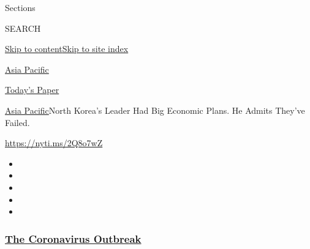Sections

SEARCH

\protect\hyperlink{site-content}{Skip to
content}\protect\hyperlink{site-index}{Skip to site index}

\href{https://www.nytimes3xbfgragh.onion/section/world/asia}{Asia
Pacific}

\href{https://myaccount.nytimes3xbfgragh.onion/auth/login?response_type=cookie\&client_id=vi}{}

\href{https://www.nytimes3xbfgragh.onion/section/todayspaper}{Today's
Paper}

\href{/section/world/asia}{Asia Pacific}\textbar{}North Korea's Leader
Had Big Economic Plans. He Admits They've Failed.

\url{https://nyti.ms/2Q8o7wZ}

\begin{itemize}
\item
\item
\item
\item
\item
\end{itemize}

\hypertarget{the-coronavirus-outbreak}{%
\subsubsection{\texorpdfstring{\href{https://www.nytimes3xbfgragh.onion/news-event/coronavirus?name=styln-coronavirus-national\&region=TOP_BANNER\&variant=undefined\&block=storyline_menu_recirc\&action=click\&pgtype=Article\&impression_id=00e6e870-e390-11ea-8196-a386cc1d5613}{The
Coronavirus
Outbreak}}{The Coronavirus Outbreak}}\label{the-coronavirus-outbreak}}

